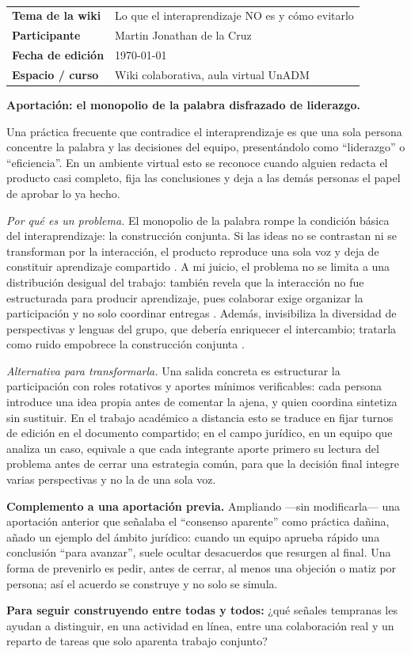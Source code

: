 \documentclass[
  spanish,
  letterpaper, oneside
]{article}
\makeatletter
\newcommand{\wikiCopyButton}[1]{%
  \textattachfile[appearance={},description={Contribucion a la wiki (texto copiable)},mimetype=text/plain]{#1}{%
    \colorbox{unadmGreen}{\small\textcolor{white}{\,Copiar contribución\,}}%
  }%
}
\newcommand{\wikimeta}[4]{%
  \begin{tcolorbox}[colback=unadmRowAlt,colframe=unadmRowAlt,boxrule=0pt,arc=1mm,
    left=2mm,right=2mm,top=1.5mm,bottom=1.5mm]
  {\small\begin{tabular}{@{}p{3.4cm}p{9.6cm}@{}}
    \textbf{Tema de la wiki} & #1 \\
    \textbf{Participante} & #2 \\
    \textbf{Fecha de edición} & #3 \\
    \textbf{Espacio / curso} & #4 \\
  \end{tabular}}
  \end{tcolorbox}\medskip}
\makeatother
\begin{document}
\begin{wikibox}[title={Contribución publicada en la wiki colaborativa}]
\hfill\wikiCopyButton{wiki-participacion-Actividad-3.txt}\\[-0.5em]
\label{wiki-participacion}
\wikimeta{Lo que el interaprendizaje NO es y cómo evitarlo}{Martin Jonathan de la Cruz}{\today}{Wiki colaborativa, aula virtual UnADM}

\textbf{Aportación: el monopolio de la palabra disfrazado de liderazgo.}\par
\medskip
Una práctica frecuente que contradice el interaprendizaje es que una sola persona
concentre la palabra y las decisiones del equipo, presentándolo como ``liderazgo'' o
``eficiencia''. En un ambiente virtual esto se reconoce cuando alguien redacta el
producto casi completo, fija las conclusiones y deja a las demás personas el papel de
aprobar lo ya hecho.

\textit{Por qué es un problema.} El monopolio de la palabra rompe la condición básica
del interaprendizaje: la construcción conjunta. Si las ideas no se contrastan ni se
transforman por la interacción, el producto reproduce una sola voz y deja de constituir
aprendizaje compartido \citep{bertely2011interaprendizajes}. A mi juicio, el problema no
se limita a una distribución desigual del trabajo: también revela que la interacción no
fue estructurada para producir aprendizaje, pues colaborar exige organizar la
participación y no solo coordinar entregas \citep{diazAlonso2011construccion}. Además,
invisibiliza la diversidad de perspectivas y lenguas del grupo, que debería enriquecer
el intercambio; tratarla como ruido empobrece la construcción conjunta \citep{pech2016manual}.

\textit{Alternativa para transformarla.} Una salida concreta es estructurar la
participación con roles rotativos y aportes mínimos verificables: cada persona
introduce una idea propia antes de comentar la ajena, y quien coordina sintetiza sin
sustituir. En el trabajo académico a distancia esto se traduce en fijar turnos de
edición en el documento compartido; en el campo jurídico, en un equipo que analiza un
caso, equivale a que cada integrante aporte primero su lectura del problema antes de
cerrar una estrategia común, para que la decisión final integre varias perspectivas y
no la de una sola voz.

\medskip
\textbf{Complemento a una aportación previa.} Ampliando —sin modificarla— una
aportación anterior que señalaba el ``consenso aparente'' como práctica dañina, añado
un ejemplo del ámbito jurídico: cuando un equipo aprueba rápido una conclusión ``para
avanzar'', suele ocultar desacuerdos que resurgen al final. Una forma de prevenirlo es
pedir, antes de cerrar, al menos una objeción o matiz por persona; así el acuerdo se
construye y no solo se simula.

\medskip
\textbf{Para seguir construyendo entre todas y todos:} ¿qué señales tempranas les
ayudan a distinguir, en una actividad en línea, entre una colaboración real y un
reparto de tareas que solo aparenta trabajo conjunto?
\end{wikibox}
\end{document}
